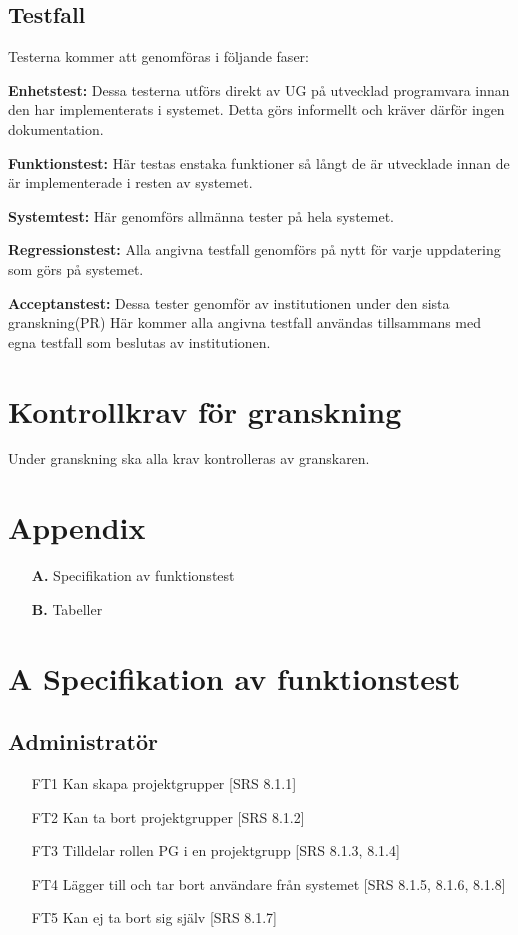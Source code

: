 \documentclass[paper=a4, fontsize=11pt,twoside]{article}
\begin{document}
\subsection{Testfall}

Testerna kommer att genomföras i följande faser:

{\bf Enhetstest:} Dessa testerna utförs direkt av UG på utvecklad programvara
innan den har implementerats i systemet. Detta görs informellt och kräver därför ingen dokumentation.

{\bf Funktionstest:} Här testas enstaka funktioner så långt de är utvecklade
innan de är implementerade i resten av systemet.

{\bf Systemtest:} Här genomförs allmänna tester på hela systemet. 

{\bf Regressionstest:} Alla angivna testfall genomförs på nytt för varje
uppdatering som görs på systemet.

{\bf Acceptanstest:} Dessa tester genomför av institutionen under den sista
granskning(PR) Här kommer alla angivna testfall användas tillsammans med egna testfall som beslutas av institutionen.

 
\section{Kontrollkrav för granskning}

Under granskning ska alla krav kontrolleras av granskaren.

\section{Appendix}

\begin{itemize}
\item[\bf A.] Specifikation av funktionstest
\item[\bf B.] Tabeller
\end{itemize}

\section*{A Specifikation av funktionstest}

\subsection{Administratör}
\begin{itemize}
\item[FT1] Kan skapa projektgrupper [SRS 8.1.1] 
\item[FT2] Kan ta bort projektgrupper [SRS 8.1.2] 
\item[FT3] Tilldelar rollen PG i en projektgrupp [SRS 8.1.3, 8.1.4]
\item[FT4] Lägger till och tar bort användare från systemet [SRS 8.1.5, 8.1.6,
8.1.8]
\item[FT5] Kan ej ta bort sig själv [SRS 8.1.7]
\end{itemize}
\end{document}
